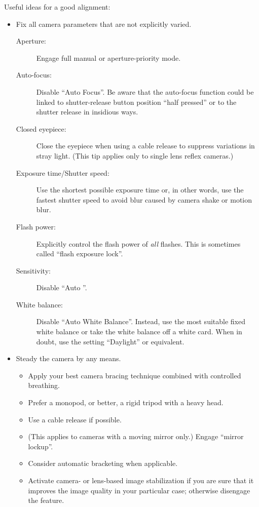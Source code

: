 \noindent Useful ideas for a good alignment:
\begin{itemize}
\item
  Fix all camera parameters that are not explicitly varied.

  \begin{description}
  \item[Aperture:] Engage full manual or aperture-priority mode.

  \item[Auto-focus:] Disable ``Auto Focus''.  Be aware that the
    auto-focus function could be linked to shutter-release button
    position ``half pressed'' or to the shutter release in insidious
    ways.

  \item[Closed eyepiece:] Close the eyepiece when using a cable
    release to suppress variations in stray light.  (This tip applies
    only to single lens reflex cameras.)

  \item[Exposure time/Shutter speed:] Use the shortest possible
    exposure time or, in other words, use the fastest shutter speed to
    avoid blur caused by camera shake or motion blur.

  \item[Flash power:] Explicitly control the flash power of \emph{all}
    flashes.  This is sometimes called ``flash exposure lock''.

  \item[Sensitivity:] Disable ``Auto ''.

  \item[White balance:] Disable ``Auto White Balance''.  Instead, use
    the most suitable fixed white balance or take the white balance
    off a white card.  When in doubt, use the setting ``Daylight'' or
    equivalent.
  \end{description}

\item
  Steady the camera by any means.

  \begin{itemize}
  \item
    Apply your best camera bracing technique combined with controlled
    breathing.
  \item
    Prefer a monopod, or better, a rigid tripod with a heavy head.
  \item
    Use a cable release if possible.
  \item
    (This applies to cameras with a moving mirror only.)  Engage
    ``mirror lockup''.
  \item
    Consider automatic bracketing when applicable.
  \item
    Activate camera- or lens-based image stabilization if you are sure
    that it improves the image quality in your particular case;
    otherwise disengage the feature.


\end{itemize}
\end{itemize}
